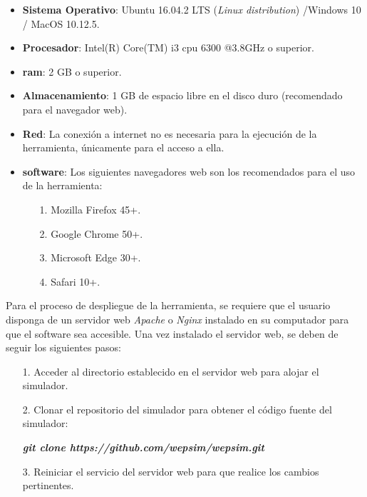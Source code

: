 \begin{itemize}

\item \textbf{Sistema Operativo}: Ubuntu 16.04.2 LTS (\emph{Linux distribution}) /Windows 10 / MacOS 10.12.5.

\item \textbf{Procesador}: Intel(R) Core(TM) i3 \acrshort{cpu} 6300 @3.8GHz o superior.

\item \textbf{\gls{ram}}: 2 GB o superior.

\item \textbf{Almacenamiento}: 1 GB de espacio libre en el disco duro (recomendado para el navegador web).

\item \textbf{Red}: La conexión a internet no es necesaria para la ejecución de la herramienta, únicamente para el acceso a ella.

\item \textbf{\gls{software}}: Los siguientes navegadores web son los recomendados para el uso de la herramienta:

	\begin{itemize}

	\item[1.] Mozilla Firefox 45+.
	
	\item[2.] Google Chrome 50+.
	
	\item[3.] Microsoft Edge 30+.
	
	\item[4.] Safari 10+.

	\end{itemize}

\end{itemize}

Para el proceso de despliegue de la herramienta, se requiere que el usuario disponga de un servidor web \textit{Apache}  o \textit{Nginx} instalado en su computador para que el \gls{software} sea accesible. Una vez instalado el servidor web, se deben de seguir los siguientes pasos:

\begin{itemize}

	\item[1.] Acceder al directorio establecido en el servidor web para alojar el simulador.

	\item[2.] Clonar el repositorio del simulador para obtener el código fuente del simulador:
	
	 \textbf{\textit{git clone https://github.com/wepsim/wepsim.git}}
	
	\item[3.] Reiniciar el servicio del servidor web para que realice los cambios pertinentes.

\end{itemize}

